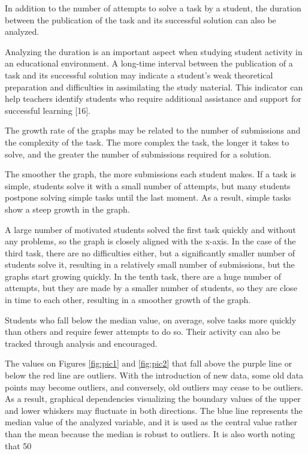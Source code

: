\documentclass{article}
\begin{document}
\begin{multicols}{2}
\begin{justify}
      In addition to the number of attempts to solve a task by a student, the duration between the publication of the task and its successful solution can also be analyzed.

      Analyzing the duration is an important aspect when studying student activity in an educational environment. A long-time interval between the publication of a task and its successful solution may indicate a student's weak theoretical preparation and difficulties in assimilating the study material. This indicator can help teachers identify students who require additional assistance and support for successful learning [16].

      The growth rate of the graphs may be related to the number of submissions and the complexity of the task. The more complex the task, the longer it takes to solve, and the greater the number of submissions required for a solution.

      The smoother the graph, the more submissions each student makes. If a task is simple, students solve it with a small number of attempts, but many students postpone solving simple tasks until the last moment. As a result, simple tasks show a steep growth in the graph.

      A large number of motivated students solved the first task quickly and without any problems, so the graph is closely aligned with the x-axis. In the case of the third task, there are no difficulties either, but a significantly smaller number of students solve it, resulting in a relatively small number of submissions, but the graphs start growing quickly. In the tenth task, there are a huge number of attempts, but they are made by a smaller number of students, so they are close in time to each other, resulting in a smoother growth of the graph.

      Students who fall below the median value, on average, solve tasks more quickly than others and require fewer attempts to do so. Their activity can also be tracked through analysis and encouraged.

      The values on Figures \ref{fig:pic1} and \ref{fig:pic2} that fall above the purple line or below the red line are outliers. With the introduction of new data, some old data points may become outliers, and conversely, old outliers may cease to be outliers. As a result, graphical dependencies visualizing the boundary values of the upper and lower whiskers may fluctuate in both directions. The blue line represents the median value of the analyzed variable, and it is used as the central value rather than the mean because the median is robust to outliers. It is also worth noting that 50%


\end{justify}
\end{multicols}
\end{document}
